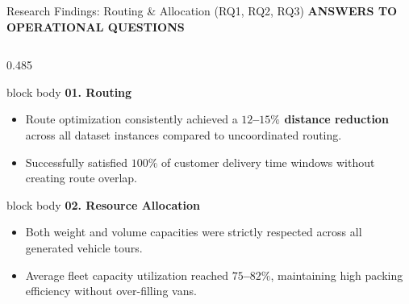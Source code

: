 \documentclass[aspectratio=169,10pt]{beamer}
\newcommand{\sectiontag}[1]{%
    {\scriptsize\bfseries\color{Accent}\MakeUppercase{#1}}\par\vspace{0.08cm}
}
\begin{document}
\begin{frame}{Research Findings: Routing \& Allocation (RQ1, RQ2, RQ3)}
\sectiontag{Answers to Operational Questions}

\vspace{-0.15cm}

\begin{columns}[T,totalwidth=\textwidth]

    \begin{column}{0.485\textwidth}
        \begin{beamercolorbox}[rounded=true,shadow=false,wd=\linewidth,sep=4.5pt]{block body}
            {\bfseries\color{Primary}\small 01. Routing }\par\vspace{0.04cm}
            \footnotesize
            \begin{itemize}
                \setlength{\itemsep}{2pt}
                \scriptsize
                \item Route optimization consistently achieved a \textbf{$12$--$15\%$ distance reduction} across all dataset instances compared to uncoordinated routing.
                \item Successfully satisfied $100\%$ of customer delivery time windows without creating route overlap.
            \end{itemize}
        \end{beamercolorbox}

        \vspace{0.12cm}

        \begin{beamercolorbox}[rounded=true,shadow=false,wd=\linewidth,sep=4.5pt]{block body}
            {\bfseries\color{Primary}\small 02. Resource Allocation }\par\vspace{0.04cm}
            \footnotesize
            \begin{itemize}
                \setlength{\itemsep}{2pt}
                \scriptsize
                \item Both weight and volume capacities were strictly respected across all generated vehicle tours.
                \item Average fleet capacity utilization reached \textbf{$75$--$82\%$}, maintaining high packing efficiency without over-filling vans.
            \end{itemize}
        \end{beamercolorbox}
    \end{column}


\end{columns}
\end{frame}
\end{document}
